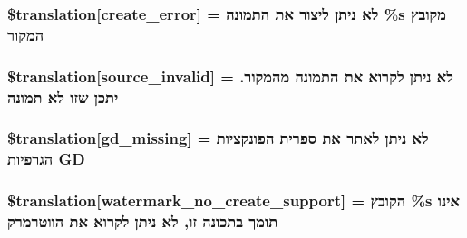 \subsubsection[{\$translation}]{\setlength{\rightskip}{0pt plus 5cm}\$translation\mbox{[}\textquotesingle{}create\+\_\+error\textquotesingle{}\mbox{]} = \textquotesingle{}לא ניתן ליצור את התמונה \%s מקובץ המקור\textquotesingle{}}\label{class_8upload_8he___i_l_8php_a53013ce9255c4e1849098ddd9fdb2b3f}
\hypertarget{class_8upload_8he___i_l_8php_a6ab0a660b457eaf2d3434b225449fdd6}{}
\subsubsection[{\$translation}]{\setlength{\rightskip}{0pt plus 5cm}\$translation\mbox{[}\textquotesingle{}source\+\_\+invalid\textquotesingle{}\mbox{]} = \textquotesingle{}לא ניתן לקרוא את התמונה מהמקור. יתכן שזו לא תמונה\textquotesingle{}}\label{class_8upload_8he___i_l_8php_a6ab0a660b457eaf2d3434b225449fdd6}
\hypertarget{class_8upload_8he___i_l_8php_a7f3dfcc0db4bbc0f2e7210c439798e56}{}
\subsubsection[{\$translation}]{\setlength{\rightskip}{0pt plus 5cm}\$translation\mbox{[}\textquotesingle{}gd\+\_\+missing\textquotesingle{}\mbox{]} = \textquotesingle{}לא ניתן לאתר את ספרית הפונקציות הגרפיות G\+D\textquotesingle{}}\label{class_8upload_8he___i_l_8php_a7f3dfcc0db4bbc0f2e7210c439798e56}
\hypertarget{class_8upload_8he___i_l_8php_a82d5853430ab72dc1f9799ec36144cc6}{}
\subsubsection[{\$translation}]{\setlength{\rightskip}{0pt plus 5cm}\$translation\mbox{[}\textquotesingle{}watermark\+\_\+no\+\_\+create\+\_\+support\textquotesingle{}\mbox{]} = \textquotesingle{}הקובץ \%s אינו תומך בתכונה זו, לא ניתן לקרוא את הווטרמרק\textquotesingle{}}\label{class_8upload_8he___i_l_8php_a82d5853430ab72dc1f9799ec36144cc6}
\hypertarget{class_8upload_8he___i_l_8php_aabca0b65dadbc6184415c16375f284ca}{}
